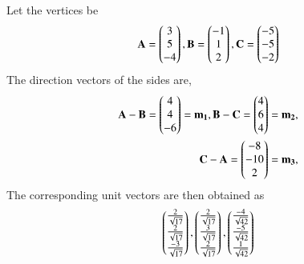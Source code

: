 Let the vertices be
\begin{align}
\mathbf{A} = \begin{pmatrix}3\\5\\-4\end{pmatrix},
\mathbf{B} = \begin{pmatrix}-1\\1\\2\end{pmatrix},
\mathbf{C} = \begin{pmatrix}-5\\-5\\-2\end{pmatrix}
\end{align}
%
The direction vectors of the sides are,
\begin{align}
\mathbf{A} - \mathbf{B} = \begin{pmatrix}4\\4\\-6\end{pmatrix} = \mathbf{m_1},
\mathbf{B} - \mathbf{C} = \begin{pmatrix}4\\6\\4\end{pmatrix} = \mathbf{m_2}, 
\\
\mathbf{C} - \mathbf{A} = \begin{pmatrix}-8\\-10\\2\end{pmatrix} =\mathbf{m_3},
\end{align}
%
The corresponding unit vectors are then obtained as
\begin{align}
 \begin{pmatrix} \frac{2}{\sqrt{17}} \\[1pt] \frac{2}{\sqrt{17}} \\[1pt] \frac{-3}{\sqrt{17}} \end{pmatrix},
 \begin{pmatrix} \frac{2}{\sqrt{17}} \\[1pt] \frac{3}{\sqrt{17}} \\[1pt] \frac{2}{\sqrt{17}} \end{pmatrix}, 
 \begin{pmatrix} \frac{-4}{\sqrt{42}} \\[1pt] \frac{-5}{\sqrt{42}} \\[1pt] \frac{1}{\sqrt{42}} \end{pmatrix} 
\end{align}

